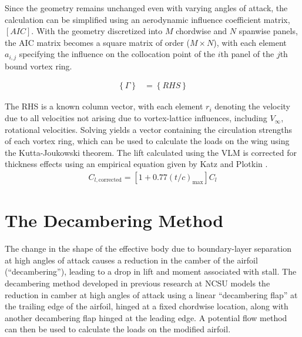 
Since the geometry remains unchanged even with varying angles of attack, the calculation can be simplified using an aerodynamic influence coefficient matrix, $[AIC]$. With the geometry discretized into $M$ chordwise and $N$ spanwise panels, the AIC matrix becomes a square matrix of order ($M \times N$), with each element $a_{i,j}$ specifying the influence on the collocation point of the $i$th panel of the $j$th bound vortex ring.

\begin{align}
    [AIC] \left\{ \Gamma \right\} &= \left\{ RHS \right\} \label{eqn:vortex-lattice-eqn}
\end{align}

The RHS is a known column vector, with each element $r_{i}$ denoting the velocity due to all velocities not arising due to vortex-lattice influences, including $V_\infty$, rotational velocities. Solving  yields a vector containing the circulation strengths of each vortex ring, which can be used to calculate the loads on the wing using the Kutta-Joukowski theorem.
The lift calculated using the VLM is corrected for thickness effects using an empirical equation given by Katz and Plotkin \cite{katz_plotkin_book_1991}.
\begin{align}
    C_{l, \text{corrected}} = \left[1 + 0.77 (t/c)_\text{max}\right] C_{l}
\end{align}

\section{The Decambering Method}
\label{sec:decambering}
The %
change in the shape of the effective body due to boundary-layer separation at high angles of attack causes a reduction in the camber of the airfoil (``decambering''), leading to a drop in lift and moment associated with stall.
The decambering method \cite{Mukherjee_poststall_2006} developed in previous research at NCSU models the reduction in camber at high angles of attack using a linear ``decambering flap'' at the trailing edge of the airfoil, hinged at a fixed chordwise location, along with another decambering flap hinged at the leading edge.
A potential flow method can then be used to calculate the loads on the modified airfoil. 


